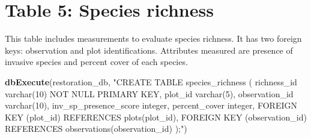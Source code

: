 \documentclass[
]{book}
\newenvironment{Shaded}{\begin{snugshade}}{\end{snugshade}}
\newcommand{\KeywordTok}[1]{\textcolor[rgb]{0.13,0.29,0.53}{\textbf{#1}}}
\newcommand{\NormalTok}[1]{#1}
\newcommand{\StringTok}[1]{\textcolor[rgb]{0.31,0.60,0.02}{#1}}
\begin{document}
\hypertarget{table-5-species-richness}{%
\section{Table 5: Species richness}\label{table-5-species-richness}}

This table includes measurements to evaluate species richness. It has two foreign keys: observation and plot identifications. Attributes measured are presence of invasive species and percent cover of each species.

\begin{Shaded}
\begin{Highlighting}[]
\KeywordTok{dbExecute}\NormalTok{(restoration_db, }\StringTok{"CREATE TABLE species_richness (}
\StringTok{          richness_id varchar(10) NOT NULL PRIMARY KEY,}
\StringTok{          plot_id varchar(5),}
\StringTok{          observation_id varchar(10),}
\StringTok{          inv_sp_presence_score integer, }
\StringTok{          percent_cover integer,}
\StringTok{          FOREIGN KEY (plot_id) REFERENCES plots(plot_id),}
\StringTok{          FOREIGN KEY (observation_id) REFERENCES observations(observation_id)}
\StringTok{          );"}\NormalTok{)}
\end{Highlighting}
\end{Shaded}

  
\end{document}
